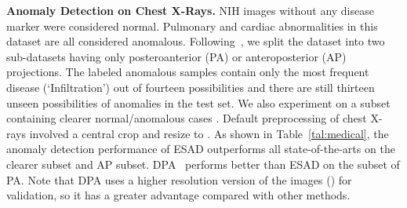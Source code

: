 \documentclass{bmvc2k}
\begin{document}
\renewcommand \arraystretch{0.95}
\begin{table*}[t]
\centering
\caption{Results on classic anomaly detection benchmark datasets with a ratio of labeled anomalies of . We report the avg. AUC in \% with st. dev. computed over 10 seeds.}
\label{tal:4}
\footnotesize
{}
\vspace{-10pt}
\end{table*}

\noindent\textbf{Anomaly Detection on Chest X-Rays.} NIH images without any disease marker were considered normal. Pulmonary and cardiac abnormalities in this dataset are all considered anomalous. Following~\cite{tang2019deep,tuluptceva2020anomaly}, we split the dataset into two sub-datasets having only posteroanterior (PA) or anteroposterior (AP) projections. The labeled anomalous samples contain only the most frequent disease (`Infiltration') out of fourteen possibilities and there are still thirteen unseen possibilities of anomalies in the test set. We also experiment on a subset containing clearer normal/anomalous cases \cite{tang2019deep}. Default preprocessing of chest X-rays involved a  central crop and resize to . As shown in Table~\ref{tal:medical}, the anomaly detection performance of ESAD outperforms all state-of-the-arts on the clearer subset \cite{tang2019deep} and AP subset. DPA~\cite{tuluptceva2020anomaly} performs better than ESAD on the subset of PA. Note that DPA uses a higher resolution version of the images () for validation, so it has a greater advantage compared with other methods.
\end{document}
